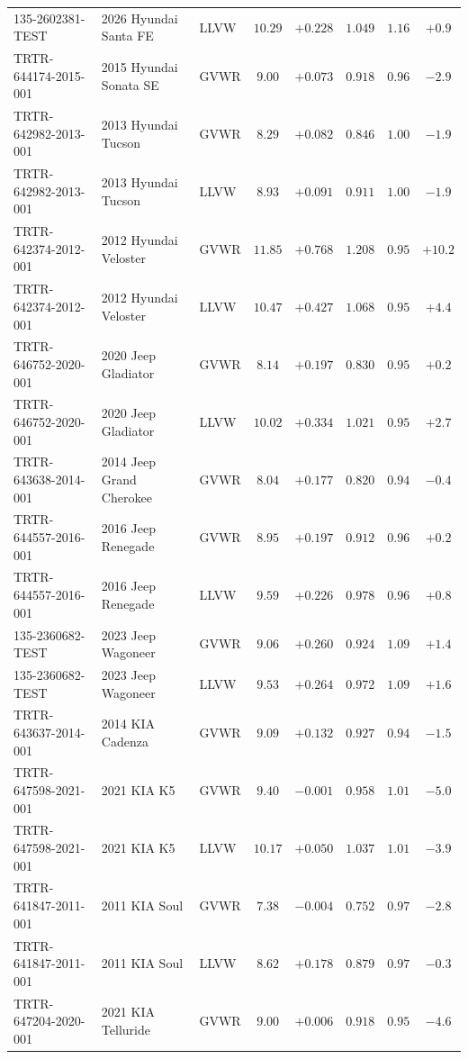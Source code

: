 {\begin{longtable}{lp{2.9cm}lccccc}
135-2602381-TEST & 2026 Hyundai Santa FE & LLVW & $10.29$ & $+0.228$ & $1.049$ & $1.16$ & $+0.9$\\
TRTR-644174-2015-001 & 2015 Hyundai Sonata SE & GVWR & $9.00$ & $+0.073$ & $0.918$ & $0.96$ & $-2.9$\\
TRTR-642982-2013-001 & 2013 Hyundai Tucson & GVWR & $8.29$ & $+0.082$ & $0.846$ & $1.00$ & $-1.9$\\
TRTR-642982-2013-001 & 2013 Hyundai Tucson & LLVW & $8.93$ & $+0.091$ & $0.911$ & $1.00$ & $-1.9$\\
TRTR-642374-2012-001 & 2012 Hyundai Veloster & GVWR & $11.85$ & $+0.768$ & $1.208$ & $0.95$ & $+10.2$\\
TRTR-642374-2012-001 & 2012 Hyundai Veloster & LLVW & $10.47$ & $+0.427$ & $1.068$ & $0.95$ & $+4.4$\\
TRTR-646752-2020-001 & 2020 Jeep Gladiator & GVWR & $8.14$ & $+0.197$ & $0.830$ & $0.95$ & $+0.2$\\
TRTR-646752-2020-001 & 2020 Jeep Gladiator & LLVW & $10.02$ & $+0.334$ & $1.021$ & $0.95$ & $+2.7$\\
TRTR-643638-2014-001 & 2014 Jeep Grand Cherokee & GVWR & $8.04$ & $+0.177$ & $0.820$ & $0.94$ & $-0.4$\\
TRTR-644557-2016-001 & 2016 Jeep Renegade & GVWR & $8.95$ & $+0.197$ & $0.912$ & $0.96$ & $+0.2$\\
TRTR-644557-2016-001 & 2016 Jeep Renegade & LLVW & $9.59$ & $+0.226$ & $0.978$ & $0.96$ & $+0.8$\\
135-2360682-TEST & 2023 Jeep Wagoneer & GVWR & $9.06$ & $+0.260$ & $0.924$ & $1.09$ & $+1.4$\\
135-2360682-TEST & 2023 Jeep Wagoneer & LLVW & $9.53$ & $+0.264$ & $0.972$ & $1.09$ & $+1.6$\\
TRTR-643637-2014-001 & 2014 KIA Cadenza & GVWR & $9.09$ & $+0.132$ & $0.927$ & $0.94$ & $-1.5$\\
TRTR-647598-2021-001 & 2021 KIA K5 & GVWR & $9.40$ & $-0.001$ & $0.958$ & $1.01$ & $-5.0$\\
TRTR-647598-2021-001 & 2021 KIA K5 & LLVW & $10.17$ & $+0.050$ & $1.037$ & $1.01$ & $-3.9$\\
TRTR-641847-2011-001 & 2011 KIA Soul & GVWR & $7.38$ & $-0.004$ & $0.752$ & $0.97$ & $-2.8$\\
TRTR-641847-2011-001 & 2011 KIA Soul & LLVW & $8.62$ & $+0.178$ & $0.879$ & $0.97$ & $-0.3$\\
TRTR-647204-2020-001 & 2021 KIA Telluride & GVWR & $9.00$ & $+0.006$ & $0.918$ & $0.95$ & $-4.6$\\

\end{longtable}}
